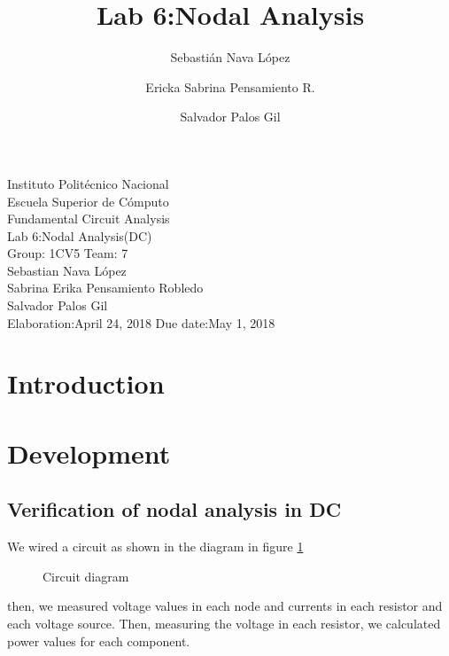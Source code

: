 \documentclass[letterpaper]{article}
\title{Lab 6:Nodal Analysis}
\author{
    Sebastián Nava López\\
    \and
    Ericka Sabrina Pensamiento R.\\
    \and
    Salvador Palos Gil
}
\begin{document}
\begin{titlepage}
    \centering
    {\Huge Instituto Politécnico Nacional}\\[3ex]
    {\huge Escuela Superior de Cómputo}\\[8ex]
    {\huge Fundamental Circuit Analysis}\\[12ex]
    {\Large Lab 6:Nodal Analysis(DC)}\\[20ex]
    {\Large Group: 1CV5 Team: 7 \\[8ex]
    Sebastian Nava López\\[4ex]
    Sabrina Erika Pensamiento Robledo\\[4ex]
    Salvador Palos Gil\\[18ex]
    }
    \large{Elaboration:April 24, 2018 \hspace{8em} Due date:May 1, 2018}
\end{titlepage}
\tableofcontents
\newpage
\section{Introduction}
\newpage
\section{Development}
\subsection{Verification of nodal analysis in DC}
We wired a circuit as shown in the diagram in figure \ref{fig:1}
\begin{figure}[H]
    \caption{Circuit diagram}
    \label{fig:1}
\end{figure}
then, we measured voltage values in each node and currents in each resistor and each voltage
source. Then, measuring the voltage in each resistor, we calculated power values for each
component.
\end{document}
